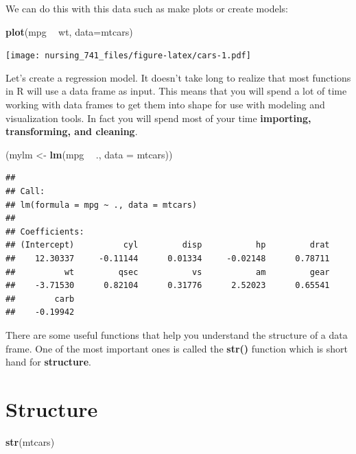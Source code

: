 \documentclass[]{book}
\newenvironment{Shaded}{\begin{snugshade}}{\end{snugshade}}
\newcommand{\DataTypeTok}[1]{\textcolor[rgb]{0.13,0.29,0.53}{#1}}
\newcommand{\KeywordTok}[1]{\textcolor[rgb]{0.13,0.29,0.53}{\textbf{#1}}}
\newcommand{\NormalTok}[1]{#1}
\newcommand{\OperatorTok}[1]{\textcolor[rgb]{0.81,0.36,0.00}{\textbf{#1}}}
\newcommand{\StringTok}[1]{\textcolor[rgb]{0.31,0.60,0.02}{#1}}
\begin{document}
We can do this with this data such as make plots or create models:

\begin{Shaded}
\begin{Highlighting}[]
\KeywordTok{plot}\NormalTok{(mpg }\OperatorTok{~}\StringTok{ }\NormalTok{wt, }\DataTypeTok{data=}\NormalTok{mtcars)}
\end{Highlighting}
\end{Shaded}

\texttt{[image: nursing\_741\_files/figure-latex/cars-1.pdf]}

Let's create a regression model. It doesn't take long to realize that most functions in R will use a data frame as input. This means that you will spend a lot of time working with data frames to get them into shape for use with modeling and visualization tools. In fact you will spend most of your time \textbf{importing, transforming, and cleaning}.

\begin{Shaded}
\begin{Highlighting}[]
\NormalTok{(mylm <-}\StringTok{ }\KeywordTok{lm}\NormalTok{(mpg }\OperatorTok{~}\StringTok{ }\NormalTok{., }\DataTypeTok{data =}\NormalTok{ mtcars))}
\end{Highlighting}
\end{Shaded}

\begin{verbatim}
## 
## Call:
## lm(formula = mpg ~ ., data = mtcars)
## 
## Coefficients:
## (Intercept)          cyl         disp           hp         drat  
##    12.30337     -0.11144      0.01334     -0.02148      0.78711  
##          wt         qsec           vs           am         gear  
##    -3.71530      0.82104      0.31776      2.52023      0.65541  
##        carb  
##    -0.19942
\end{verbatim}

There are some useful functions that help you understand the structure of a data frame. One of the most important ones is called the \textbf{str()} function which is short hand for \textbf{structure}.

\hypertarget{structure}{%
\section{Structure}\label{structure}}

\begin{Shaded}
\begin{Highlighting}[]
\KeywordTok{str}\NormalTok{(mtcars)}
\end{Highlighting}
\end{Shaded}
\end{document}

